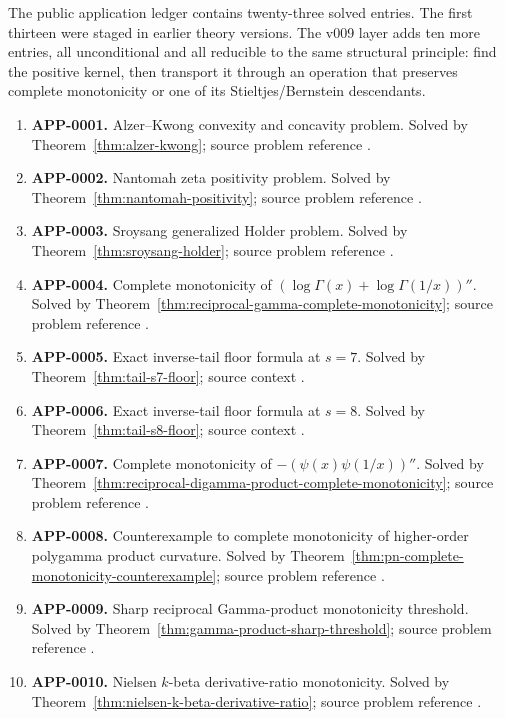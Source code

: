 \documentclass[11pt]{article}
\numberwithin{equation}{section}
\theoremstyle{definition}
\theoremstyle{remark}
\newcommand{\1}{\mathbf 1}
\begin{document}
The public application ledger contains twenty-three solved entries.  The first
thirteen were staged in earlier theory versions.  The v009 layer adds ten more
entries, all unconditional and all reducible to the same structural principle:
find the positive kernel, then transport it through an operation that preserves
complete monotonicity or one of its Stieltjes/Bernstein descendants.
\begin{enumerate}
\item \textbf{APP-0001.} Alzer--Kwong convexity and concavity problem.  Solved by Theorem~\ref{thm:alzer-kwong}; source problem reference \cite{alzer-kwong}.
\item \textbf{APP-0002.} Nantomah zeta positivity problem.  Solved by Theorem~\ref{thm:nantomah-positivity}; source problem reference \cite{nantomah}.
\item \textbf{APP-0003.} Sroysang generalized Holder problem.  Solved by Theorem~\ref{thm:sroysang-holder}; source problem reference \cite{sroysang}.
\item \textbf{APP-0004.} Complete monotonicity of \((\log\Gamma(x)+\log\Gamma(1/x))''\).  Solved by Theorem~\ref{thm:reciprocal-gamma-complete-monotonicity}; source problem reference \cite{qi-lim-nantomah-polygamma}.
\item \textbf{APP-0005.} Exact inverse-tail floor formula at \(s=7\).  Solved by Theorem~\ref{thm:tail-s7-floor}; source context \cite{kim-song-tail,pan-wu-tail}.
\item \textbf{APP-0006.} Exact inverse-tail floor formula at \(s=8\).  Solved by Theorem~\ref{thm:tail-s8-floor}; source context \cite{kim-song-tail,pan-wu-tail}.
\item \textbf{APP-0007.} Complete monotonicity of \(-(\psi(x)\psi(1/x))''\).  Solved by Theorem~\ref{thm:reciprocal-digamma-product-complete-monotonicity}; source problem reference \cite{qi-lim-nantomah-polygamma}.
\item \textbf{APP-0008.} Counterexample to complete monotonicity of higher-order polygamma product curvature.  Solved by Theorem~\ref{thm:pn-complete-monotonicity-counterexample}; source problem reference \cite{qi-lim-nantomah-polygamma}.
\item \textbf{APP-0009.} Sharp reciprocal Gamma-product monotonicity threshold.  Solved by Theorem~\ref{thm:gamma-product-sharp-threshold}; source problem reference \cite{bulboaca-zayed-gamma}.
\item \textbf{APP-0010.} Nielsen \(k\)-beta derivative-ratio monotonicity.  Solved by Theorem~\ref{thm:nielsen-k-beta-derivative-ratio}; source problem reference \cite{yin-zhang-k-beta}.

\end{enumerate}
\end{document}
